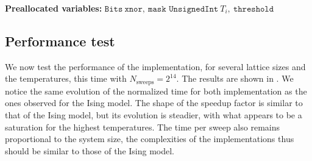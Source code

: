 \begin{algorithm}[t]
\DontPrintSemicolon
\caption{Bitwise spin glass Metropolis}


\BlankLine
\textbf{Preallocated variables:} $\mathtt{Bits}\ \texttt{xnor},\ \texttt{mask}$\;
 $\mathtt{UnsignedInt}\ T_i,\ \texttt{threshold}$\;

\BlankLine


\label{alg:SG_bitwise}
\end{algorithm}
\FloatBarrier
\subsection{Performance test}
 We now test the performance of the implementation, for several lattice sizes and the temperatures, this time with $N_\text{sweeps}=2^{14}$. The results are shown in . We notice the same evolution of the normalized time for both implementation as the ones observed for the Ising model. The shape of the speedup factor is similar to that of the Ising model, but its evolution is steadier, with what appears to be a saturation for the highest temperatures. The time per sweep also remains proportional to the system size, the complexities of the implementations thus should be similar to those of the Ising model.

